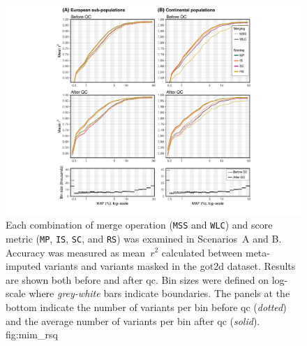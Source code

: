 

\begin{figure}[!htb]
\includegraphics[width=\textwidth]{./img/ch2/accuracy_mim_maf_rsq}
{Each combination of merge operation (\texttt{MSS} and \texttt{WLC}) and score metric (\texttt{MP}, \texttt{IS}, \texttt{SC}, and \texttt{RS}) was examined in Scenarios~A and B.
Accuracy was measured as mean~${r^2}$ calculated between meta-imputed variants and variants masked in the \gls{got2d} dataset.
Results are shown both before and after \gls{qc}.
Bin sizes were defined on log-scale where \emph{grey-white} bars indicate boundaries.
The panels at the bottom indicate the number of variants per bin before \gls{qc} (\emph{dotted}) and the average number of variants per bin after \gls{qc} (\emph{solid}).}
{fig:mim_rsq}
\end{figure}
